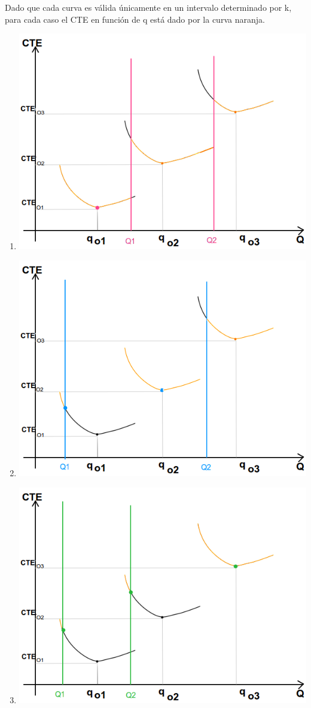 \documentclass{article}
\begin{document}
Dado que cada curva es válida únicamente en un intervalo determinado por k, para cada caso el CTE en función de q está dado por la curva naranja.\\
\begin{enumerate}
  \item \includegraphics[scale=0.5,keepaspectratio=true]{img/8/8_QvsCTE_1b.png} 
  \item \includegraphics[scale=0.5,keepaspectratio=true]{img/8/8_QvsCTE_2b.png} 
  \item \includegraphics[scale=0.5,keepaspectratio=true]{img/8/8_QvsCTE_3b.png} 
\end{enumerate}
\end{document}
